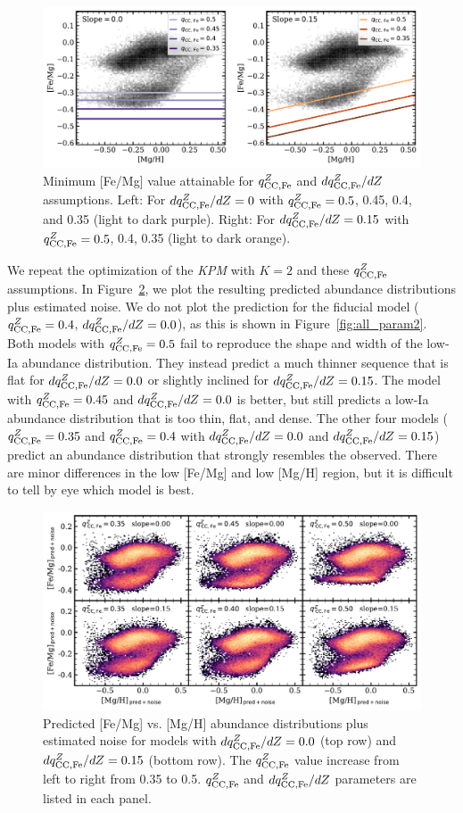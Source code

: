 \documentclass[modern]{aastex631}
\newcommand{\qccFe}{q_{{\rm CC, Fe}}^{Z}}
\newcommand{\dqccFe}{dq_{{\rm CC, Fe}}^{Z}/dZ}
\newcommand{\name}{\textsl{KPM}}
\begin{document}
\begin{figure}[htb!]
    \centering
    \includegraphics[width=\textwidth]{Paper/Figures/qccFe_FeMg.pdf}
    \caption{Minimum [Fe/Mg] value attainable for $\qccFe$ and $\dqccFe$ assumptions. Left: For $\dqccFe=0$ with $\qccFe=0.5$, 0.45, 0.4, and 0.35 (light to dark purple). Right: For $\dqccFe=0.15$ with $\qccFe=0.5$, 0.4, 0.35 (light to dark orange).}
    \label{fig:qccFe_FeMg}
\end{figure}

We repeat the optimization of the \name{} with $K=2$ and these $\qccFe$ assumptions. In Figure~\ref{fig:qccFe_FeMgpred}, we plot the resulting predicted abundance distributions plus estimated noise. We do not plot the prediction for the fiducial model ($\qccFe=0.4$, $\dqccFe=0.0$), as this is shown in Figure~\ref{fig:all_param2}. Both models with $\qccFe=0.5$ fail to reproduce the shape and width of the low-Ia abundance distribution. They instead predict a much thinner sequence that is flat for $\dqccFe=0.0$ or slightly inclined for $\dqccFe=0.15$. The model with $\qccFe=0.45$ and $\dqccFe=0.0$ is better, but still predicts a low-Ia abundance distribution that is too thin, flat, and dense. The other four models ($\qccFe=0.35$ and $\qccFe=0.4$ with $\dqccFe=0.0$ and $\dqccFe=0.15$) predict an abundance distribution that strongly resembles the observed. There are minor differences in the low [Fe/Mg] and low [Mg/H] region, but it is difficult to tell by eye which model is best.

\begin{figure}[htb!]
    \centering
    \includegraphics[width=\textwidth]{Paper/Figures/qccFe_FeMgpred.pdf}
    \caption{Predicted [Fe/Mg] vs. [Mg/H] abundance distributions plus estimated noise for models with $\dqccFe=0.0$ (top row) and $\dqccFe=0.15$ (bottom row). The $\qccFe$ value increase from left to right from 0.35 to 0.5. $\qccFe$ and $\dqccFe$ parameters are listed in each panel.}
    \label{fig:qccFe_FeMgpred}
\end{figure}
\end{document}
